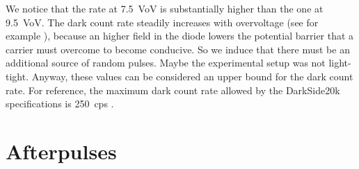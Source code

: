 \begin{table}
    
    
    
\end{table}

We notice that the rate at \SI{7.5}{VoV} is substantially higher than the one
at \SI{9.5}{VoV}. The dark count rate steadily increases with overvoltage (see
for example \cite[fig.~3.13~p.~61]{savarese2018}), because an higher field in
the diode lowers the potential barrier that a carrier must overcome to become
conducive. So we induce that there must be an additional source of random
pulses. Maybe the experimental setup was not light-tight. Anyway, these values
can be considered an upper bound for the dark count rate. For reference, the
maximum dark count rate allowed by the DarkSide20k specifications is
\SI{250}{cps} \cite[tab.~3.1~p.~62]{savarese2018}.

\section{Afterpulses}

